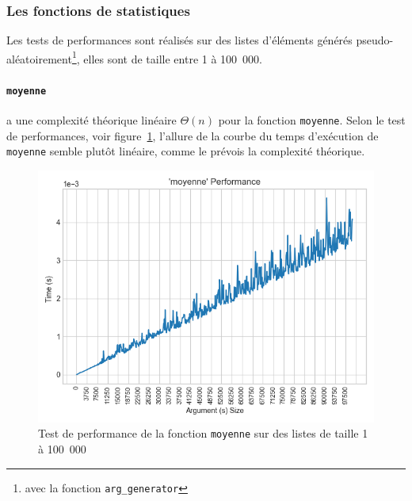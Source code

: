 \documentclass[12pt]{article}
\begin{document}
\subsubsection{Les fonctions de statistiques}
Les tests de performances sont réalisés sur des listes d'éléments générés pseudo-aléatoirement\footnote{avec la fonction \texttt{arg\_generator}}, elles sont de taille entre 1 à 100~000.
\paragraph{\texttt{moyenne}} a une complexité théorique linéaire $\Theta(n)$ pour la fonction \texttt{moyenne}. Selon le test de performances, voir figure~\ref{perfmoy}, l'allure de la courbe du temps d'exécution de \texttt{moyenne} semble plutôt linéaire, comme le prévois la complexité théorique.
     \begin{figure}[!h]
        \centering
        \includegraphics[scale=0.75]{Images/Performance/Stats/performance_moyenne_100000.png}
        \caption{Test de performance de la fonction \texttt{moyenne} sur des listes de taille 1 à 100~000}
        \label{perfmoy}
    \end{figure}
\end{document}
